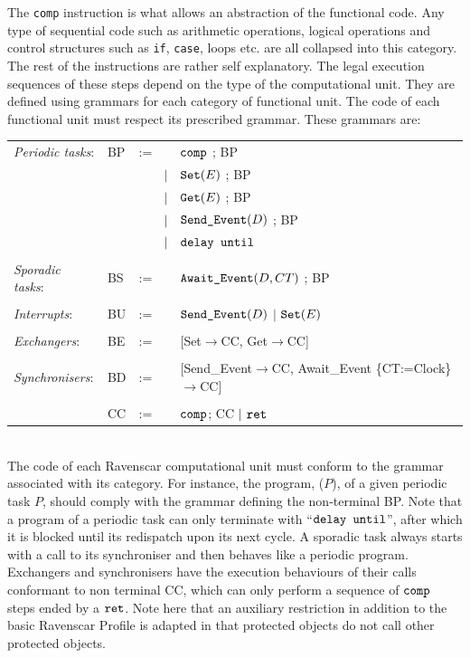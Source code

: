 The \texttt{comp} instruction is what allows an abstraction of the
functional code. Any type of sequential code such as arithmetic
operations, logical operations and control structures such as
\texttt{if}, \texttt{case}, loops etc. are all collapsed into this
category. The rest of the instructions are rather self
explanatory. The legal execution sequences of these steps depend on
the type of the computational unit. They are defined using grammars
for each category of functional unit. The code of each functional unit
must respect its prescribed grammar. These grammars are:\\

\begin{tabular}{llll}
\emph{Periodic tasks}: 
& BP & := & ${\text{\ttfamily comp}}$ ; BP \\
   & & \ \ \ \ $|$ & ${\text{\ttfamily Set}}(E)$ ; BP  \\
   & & \ \ \ \ $|$ & ${\text{\ttfamily Get}}(E)$ ; BP \\
   & & \ \ \ \ $|$ & ${\text{\ttfamily Send\_Event}}(D)$ ; BP \\
   & & \ \ \ \ $|$ & ${\text{\ttfamily delay until}}$ \\
\\
\emph{Sporadic tasks}: & BS &  := & ${\text{\ttfamily Await\_Event}}(D,
CT)$ ; BP\\ 
\\
\emph{Interrupts}: & BU & := & ${\text{\ttfamily Send\_Event}}(D)$
$|$ ${\text{\ttfamily Set}}(E)$\\
\\
\emph{Exchangers}: & BE &  := & [{\ttfamily Set}$\to$CC, {\ttfamily
  Get}$\to$CC]\\
\\
\emph{Synchronisers}: & BD & := & [{\ttfamily Send\_Event}$\to$CC, {\ttfamily Await\_Event} \{CT:=Clock\}$\to$CC] \\ 
\\
&CC &  := & ${\text{\ttfamily comp}}$; CC $|$ ${\text{\ttfamily ret}}$ \\
\end{tabular}\\

The code of each Ravenscar computational unit must conform to the
grammar associated with its category. For instance, the program,
($P$), of a given periodic task $P$, should comply
with the grammar defining the non-terminal BP. Note that a program of
a periodic task can only terminate with ``${\text{\ttfamily delay
    until}}$'', after which it is blocked until its redispatch upon
its next cycle. A sporadic task always starts with a call to its
synchroniser and then behaves like a periodic program. Exchangers and
synchronisers have the execution behaviours of their calls conformant
to non terminal CC, which can only perform a sequence of
${\text{\ttfamily comp}}$ steps ended by a ${\text{\ttfamily
    ret}}$. Note here that an auxiliary restriction in addition to the
basic Ravenscar Profile is adapted in that protected objects do not
call other protected objects.

